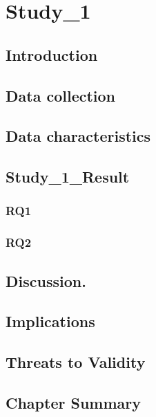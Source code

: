 \chapter{Study_1}\label{Ch:S1}



\section{Introduction}
\label{sec:Study1_intro}


\section{Data collection}
\label{sec:Study1_Methodology}


\section{Data characteristics}
\label{sec:Study1_Data_Characteristics}


\section{Study_1_Result}
\label{sec:Study1_Results}

\subsection{RQ1}
\label{sec:Study1_RQ1_Results}


\subsection{RQ2}
\label{sec:Study1_RQ2_Results}


\section{Discussion.}
\label{sec:Study1_Discussions}


\section{Implications}
\label{sec:Study1_Implications_And_Discussions}


\section{Threats to Validity}
\label{sec:Study1_Limitations_And_Threats}


\section{Chapter Summary}
\label{sec:Study1_Conclusion}
